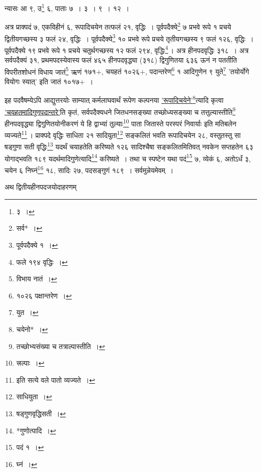 \documentclass[10pt, openany]{book}
\begin{document}
{{{{{{{{{{{{{{{न्यासः\textendash \hspace{4mm} आ ९, उ\renewcommand{\thefootnote}{३}\footnote{३~।}  ६, पाताः ७~। ३~। ९~। १२~।}
\vspace{3mm}

{अत्र प्राक्पदं ७, एकविहीनं ६, रूपादिचयेन तत्फलं २१, वृद्धिः~। 
पूर्वपदैक्ये\renewcommand{\thefootnote}{४}\footnote{सर्व*~।}  ७ प्रभवे}
{रूपे १ प्रचये द्वितीयगच्छस्य ३ फलं २४, वृद्धिः~। पूर्वपदैक्ये\renewcommand{\thefootnote}{५}\footnote{पूर्वपदैक्ये १~।}  १०
प्रभवे रूपे प्रचये तृतीयगच्छस्य ९ फलं १२६, वृद्धिः~। पूर्वपदैक्ये १९ प्रभवे रूपे १ प्रचये
चतुर्थगच्छस्य १२ फलं}
{२९४, वृद्धिः\renewcommand{\thefootnote}{६}\footnote{फले १९४ वृद्धिः~।}\,। अत्र हीनपदवृद्धिः ३१८~। अत्र सर्वपदैक्यं ३१,
प्रथमपदस्येवास्य फलं ४६५}
{हीनपदवृद्ध्या (३१८) द्विगुणितया ६३६ ऊनं न पततीति विपरीतशोधनं विधाय
जातं\renewcommand{\thefootnote}{७}\footnote{विभाय नातं~।}  ऋणं}
{१७१$+$, चयहतं १०२६$+$, पदान्तरेण\renewcommand{\thefootnote}{८}\footnote{१०२६ पक्षान्तरेण~।}  १ आदिगुणेन ९ युते\renewcommand{\thefootnote}{९}\footnote{युत~।} {\qt 'तयोर्योगे वियोगः स्यात्'} इति}
{जातं १०१७$+$~।}
\vspace{3mm}

{इह पदवैषम्येऽपि आद्युत्तरयोः साम्यात् कर्मलाघवार्थं रूपेण कल्पनया
\hyperref[99]{'रूपादिचयेने'}\renewcommand{\thefootnote}{१०}\footnote{चयेनो*~।}त्यादि कृत्वा \hyperref[99]{'चयहतमादिगुणपदान्तरे'}ति कृतं, सर्वपदैक्यधने
जितधनसङ्ख्या तच्छोध्यसङ्ख्या च तत्तुल्यास्तीति\renewcommand{\thefootnote}{११}\footnote{तच्छोभ्यसंख्या च तत्राल्पास्तीति~।}  हीनपदवृद्ध्या द्विगुणितयोनीकरणं ये हि
द्वाभ्यां तुल्याः\renewcommand{\thefootnote}{१२}\footnote{त्त्रल्पाः~।}  पाता}
{जितास्ते परस्परं निवार्याः इति मतिबलेन व्यज्यते\renewcommand{\thefootnote}{१३}\footnote{इति सत्ये वले पातो व्यज्यते~।}\,।  प्राक्पदे
वृद्धिः साधिता २१ सादियुता\renewcommand{\thefootnote}{१४}\footnote{साधियुता~।}}
{सङ्कलितं भवति रूपादिचयेन २८, वस्तुतस्तु सा षड्गुणा सती वृद्धिः\renewcommand{\thefootnote}{१५}\footnote{षड्गुणवृद्धिसती~।} 
यदर्थं चयाहतेति}
{करिष्यते १२६ सादिश्चैषा सङ्कलितमितिवत् नवकेन सप्तहतेन ६३ योगाद्भवति १८९}
{यदर्थमादिगुणेत्यादि\renewcommand{\thefootnote}{१६}\footnote{*गुणोत्पादि~।}  करिष्यते~। तथा च स्पष्टेन यथा पदं\renewcommand{\thefootnote}{१७}\footnote{पदं १~।}  ७,
व्येकं ६, अतोऽर्धं ३, चयेन ६}
{निघ्नं\renewcommand{\thefootnote}{१८}\footnote{घ्नं~।}  १८, सादिः २७, पदसङ्गुणं १८९~। सर्वमुन्नेयमेवम्~।}

\newpage

{अथ द्वितीयहीनपदजयोदाहरणम्\textemdash}

\begin{quote}
    

\end{quote}}}}}}}}}}}}}}}
\end{document}
